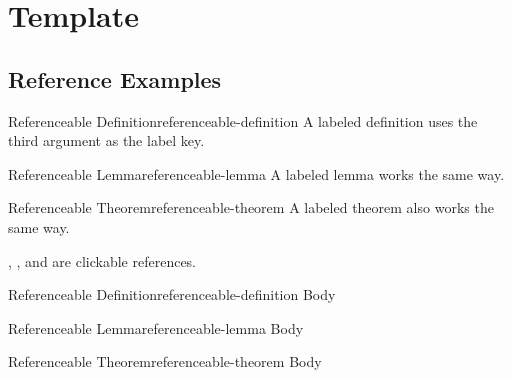  
\chapter{Template}

\section{Reference Examples}

\begin{Definition}{Referenceable Definition}{referenceable-definition}
	A labeled definition uses the third argument as the label key.
\end{Definition}

\begin{Lemma}{Referenceable Lemma}{referenceable-lemma}
	A labeled lemma works the same way.
\end{Lemma}

\begin{theorem}{Referenceable Theorem}{referenceable-theorem}
	A labeled theorem also works the same way.
\end{theorem}

, , and
 are clickable references.

\begin{latexcodeblock}[title={Reference Syntax}]
\begin{Definition}{Referenceable Definition}{referenceable-definition}
Body
\end{Definition}

\begin{Lemma}{Referenceable Lemma}{referenceable-lemma}
Body
\end{Lemma}

\begin{theorem}{Referenceable Theorem}{referenceable-theorem}
Body
\end{theorem}

\end{latexcodeblock}



